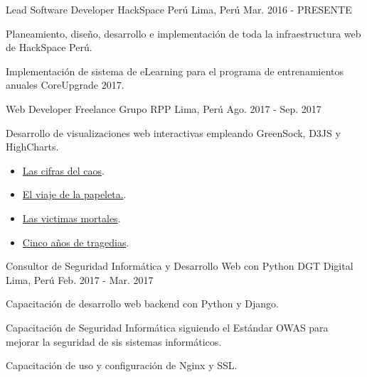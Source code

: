 \begin{cventries}
  \cventry
    {Lead Software Developer} %
    {HackSpace Perú} %
    {Lima, Perú} %
    {Mar. 2016 - PRESENTE} %
    {
      \begin{cvitems} %
        \item {Planeamiento, diseño,  desarrollo e implementación de toda la
        infraestructura web de HackSpace Perú.}
        \item {Implementación de sistema de eLearning para el programa de
        entrenamientos anuales CoreUpgrade 2017.}
      \end{cvitems}
    }

  \cventry
    {Web Developer Freelance} %
    {Grupo RPP} %
    {Lima, Perú} %
    {Ago. 2017 - Sep. 2017} %
    {
      \begin{cvitems} %
        \item {Desarrollo de visualizaciones web interactivas empleando
        GreenSock, D3JS y HighCharts.}
        \begin{itemize}
          \item {\href{https://goo.gl/oCo4gW}{Las cifras del caos}.}
          \item {\href{https://goo.gl/xPWHUZ}{El viaje de la papeleta.}.}
          \item {\href{https://goo.gl/KPA5DA}{Las victimas mortales}.}
          \item {\href{https://goo.gl/jwA8Kh}{Cinco años de tragedias}.}
        \end{itemize}
      \end{cvitems}
    }

  \cventry
    {Consultor de Seguridad Informática y Desarrollo Web con Python} %
    {DGT Digital} %
    {Lima, Perú} %
    {Feb. 2017 - Mar. 2017} %
    {
      \begin{cvitems} %
        \item {Capacitación de desarrollo web backend con Python y Django.}
        \item {Capacitación de Seguridad Informática siguiendo el Estándar OWAS
        para mejorar la seguridad de sis sistemas informáticos.}
        \item {Capacitación de uso y configuración de Nginx y SSL.}
      \end{cvitems}
    }


\end{cventries}
